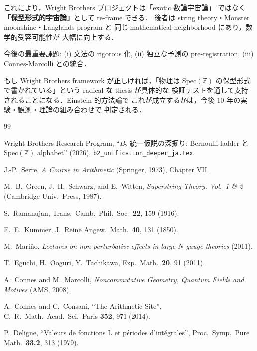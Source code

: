 \documentclass[11pt,a4paper]{article}
\begin{document}
これにより，Wright Brothers プロジェクトは「exotic 数論宇宙論」
ではなく\textbf{「保型形式的宇宙論」}として re-frame できる．
後者は string theory・Monster moonshine・Langlands program と
同じ mathematical neighborhood にあり，数学的受容可能性が
大幅に向上する．

今後の最重要課題: (i) 文法の rigorous 化, (ii) 独立な予測の
pre-registration, (iii) Connes-Marcolli との統合．

もし Wright Brothers framework が正しければ，「物理は Spec$(\mathbb{Z})$
の保型形式で書かれている」という radical な thesis が具体的な
検証テストを通して支持されることになる．Einstein 的方法論で
これが成立するかは，今後 10 年の実験・観測・理論の組み合わせで
判定される．

\begin{thebibliography}{99}

Wright Brothers Research Program, ``$B_2$ 統一仮説の深掘り:
Bernoulli ladder と Spec$(\mathbb{Z})$ alphabet'' (2026),
\texttt{b2\_unification\_deeper\_ja.tex}.

J.-P.~Serre, \textit{A Course in Arithmetic} (Springer, 1973),
Chapter VII.

M.~B.~Green, J.~H.~Schwarz, and E.~Witten, \textit{Superstring
Theory, Vol.\ 1 \& 2} (Cambridge Univ.\ Press, 1987).

S.~Ramanujan, Trans.\ Camb.\ Phil.\ Soc.\ \textbf{22}, 159 (1916).

E.~E.~Kummer, J.\ Reine Angew.\ Math.\ \textbf{40}, 131 (1850).

M.~Mari\~no, \textit{Lectures on non-perturbative effects in
large-$N$ gauge theories} (2011).

T.~Eguchi, H.~Ooguri, Y.~Tachikawa,
Exp.\ Math.\ \textbf{20}, 91 (2011).

A.~Connes and M.~Marcolli, \textit{Noncommutative Geometry,
Quantum Fields and Motives} (AMS, 2008).

A.~Connes and C.~Consani, ``The Arithmetic Site'',
C.\ R.\ Math.\ Acad.\ Sci.\ Paris \textbf{352}, 971 (2014).

P.~Deligne, ``Valeurs de fonctions L et périodes d'intégrales'',
Proc.\ Symp.\ Pure Math.\ \textbf{33.2}, 313 (1979).

\end{thebibliography}
\end{document}
